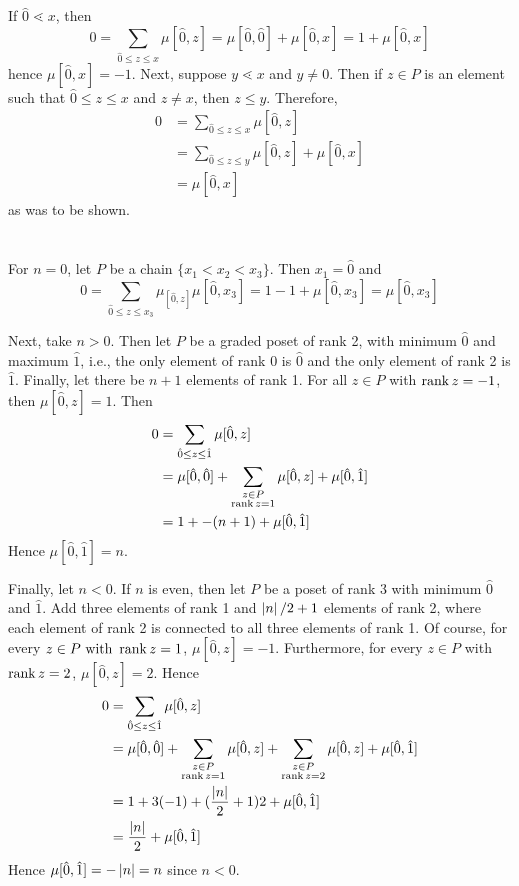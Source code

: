 \documentclass[12pt]{article}
\begin{document}
\section{}
If $\hat{0} \lessdot x$, then 
$$0 = \sum_{\hat{0} \leq z \leq x} \mu[\hat{0}, z] = \mu[\hat{0}, \hat{0}] + \mu[\hat{0}, x] = 1 + \mu[\hat{0}, x]$$
hence $\mu[\hat{0}, x] = -1$. 
Next, suppose $y \lessdot x$ and $y \neq 0$. 
Then if $z \in P$ is an element such that $\hat{0} \leq z \leq x$ and $z \neq x$, then $z \leq y$. 
Therefore, 
\begin{align*}
  0 & = \sum_{\hat{0} \leq z \leq x} \mu[\hat{0}, z] \\ 
    & = \sum_{\hat{0} \leq z \leq y} \mu[\hat{0}, z] + \mu[\hat{0}, x] \\ 
    & = \mu[\hat{0}, x]
\end{align*}
as was to be shown. 

\section{}
For $n = 0$, let $P$ be a chain $\{x_1 < x_2 < x_3\}$. 
Then $x_1 = \hat{0}$ and 
$$0 = \sum_{\hat{0} \leq z \leq x_3} \mu_[\hat{0}, z] \mu[\hat{0}, x_3] = 1 - 1 + \mu[\hat{0}, x_3] = \mu[\hat{0}, x_3]$$

Next, take $n > 0$. 
Then let $P$ be a graded poset of rank 2, with minimum $\hat{0}$ and maximum $\hat{1}$,
i.e., the only element of rank 0 is $\hat{0}$ and the only element of rank 2 is $\hat{1}$. 
Finally, let there be $n + 1$ elements of rank 1. 
For all $z \in P$ with $\operatorname{rank}{z} = -1$, then $\mu[\hat{0}, z] = 1$. 
Then 
\begin{align*}
  0 & = \sum_{\hat{0} \leq z \leq \hat{1}} \mu[\hat{0}, z] \\ 
    & = \mu[\hat{0}, \hat{0}] + \sum_{\substack{z \in P \\ \operatorname{rank}{z} = 1}} \mu[\hat{0}, z] + \mu[\hat{0}, \hat{1}] \\ 
    & = 1 + -(n + 1) + \mu[\hat{0}, \hat{1}] 
\end{align*}
Hence $\mu[\hat{0}, \hat{1}] = n$. 

Finally, let $n < 0$. 
If $n$ is even, then let $P$ be a poset of rank 3 with minimum $\hat{0}$ and $\hat{1}$. 
Add three elements of rank 1 and $\left|n\right| / 2 + 1$ elements of rank 2, where each element of rank 2 is connected to all three elements of rank 1. 
Of course, for every $z \in P \text{ with } \operatorname{rank}{z} = 1$, $\mu[\hat{0}, z] = -1$. 
Furthermore, for every $z \in P$ with $\operatorname{rank} z = 2$, $\mu[\hat{0}, z] = 2$. 
Hence 
\begin{align*}
  0 & = \sum_{\hat{0} \leq z \leq \hat{1}} \mu[\hat{0}, z] \\ 
    & = \mu[\hat{0}, \hat{0}] + \sum_{\substack{z \in P \\ \operatorname{rank}{z} = 1}}\mu[\hat{0}, z] + \sum_{\substack{z \in P \\ \operatorname{rank}{z} = 2}}\mu[\hat{0}, z] + \mu[\hat{0}, \hat{1}] \\ 
    & = 1 + 3(-1) + (\frac{\left|n\right|}{2} + 1)2 + \mu[\hat{0}, \hat{1}] \\ 
    & = \frac{\left|n\right|}{2} + \mu[\hat{0}, \hat{1}] 
\end{align*}
Hence $\mu[\hat{0}, \hat{1}] = -\left|n\right| = n$ since $n < 0$.  
\end{document}
